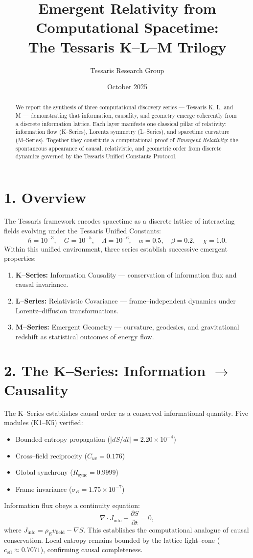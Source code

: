 \documentclass[11pt,a4paper]{article}
\title{\textbf{Emergent Relativity from Computational Spacetime:\\The Tessaris K--L--M Trilogy}}
\author{Tessaris Research Group}
\date{October 2025}
\begin{document}
\maketitle

\begin{abstract}
We report the synthesis of three computational discovery series --- Tessaris K, L, and M --- demonstrating that information, causality, and geometry emerge coherently from a discrete information lattice.  
Each layer manifests one classical pillar of relativity: information flow (K--Series), Lorentz symmetry (L--Series), and spacetime curvature (M--Series).  
Together they constitute a computational proof of \emph{Emergent Relativity}: the spontaneous appearance of causal, relativistic, and geometric order from discrete dynamics governed by the Tessaris Unified Constants Protocol.
\end{abstract}

\section{1. Overview}
The Tessaris framework encodes spacetime as a discrete lattice of interacting fields evolving under the Tessaris Unified Constants:
\[
\hbar{=}10^{-3}, \quad G{=}10^{-5}, \quad \Lambda{=}10^{-6}, \quad \alpha{=}0.5, \quad \beta{=}0.2, \quad \chi{=}1.0.
\]
Within this unified environment, three series establish successive emergent properties:
\begin{enumerate}
  \item \textbf{K--Series:} Information Causality --- conservation of information flux and causal invariance.
  \item \textbf{L--Series:} Relativistic Covariance --- frame--independent dynamics under Lorentz--diffusion transformations.
  \item \textbf{M--Series:} Emergent Geometry --- curvature, geodesics, and gravitational redshift as statistical outcomes of energy flow.
\end{enumerate}

\section{2. The K--Series: Information $\rightarrow$ Causality}
The K--Series establishes causal order as a conserved informational quantity.  
Five modules (K1--K5) verified:
\begin{itemize}
  \item Bounded entropy propagation (\(|dS/dt|=2.20\times10^{-4}\))
  \item Cross--field reciprocity (\(C_{uv}=0.176\))
  \item Global synchrony (\(R_{\mathrm{sync}}=0.9999\))
  \item Frame invariance (\(\sigma_R=1.75\times10^{-7}\))
\end{itemize}
Information flux obeys a continuity equation:
\[
\nabla\!\cdot\!J_{\mathrm{info}} + \frac{\partial S}{\partial t} = 0,
\]
where \(J_{\mathrm{info}}=\rho_E v_{\mathrm{field}}-\nabla S\).  
This establishes the computational analogue of causal conservation.  
Local entropy remains bounded by the lattice light--cone (\(c_{\mathrm{eff}}\approx0.7071\)), confirming causal completeness.
\end{document}
